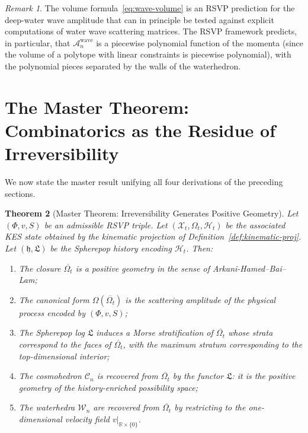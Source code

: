 \documentclass[12pt, oneside]{amsart}
\theoremstyle{plain}
\newtheorem{theorem}{Theorem}[section]
\theoremstyle{definition}
\theoremstyle{remark}
\newtheorem{remark}[theorem]{Remark}
\newcommand{\R}{\mathbb{R}}
\newcommand{\XKS}{\mathcal{X}}
\newcommand{\OmKS}{\Omega}
\newcommand{\HKS}{\mathcal{H}}
\newcommand{\hist}{\mathfrak{h}}
\newcommand{\Log}{\mathfrak{L}}
\newcommand{\Amp}{\mathcal{A}}
\newcommand{\Cosmo}{\mathcal{C}_n}
\newcommand{\Water}{\mathcal{W}_n}
\newcommand{\CF}{\Omega}   %
\begin{document}
\begin{remark}
The volume formula~\eqref{eq:wave-volume} is an RSVP prediction for the deep-water wave amplitude that can in principle be tested against explicit computations of water wave scattering matrices. The RSVP framework predicts, in particular, that $\Amp_n^{\text{wave}}$ is a piecewise polynomial function of the momenta (since the volume of a polytope with linear constraints is piecewise polynomial), with the polynomial pieces separated by the walls of the waterhedron.
\end{remark}

\section{The Master Theorem: Combinatorics as the Residue of Irreversibility}
\label{sec:unification}

We now state the master result unifying all four derivations of the preceding sections.

\begin{theorem}[Master Theorem: Irreversibility Generates Positive Geometry]
\label{thm:master}
Let $(\Phi, v, S)$ be an admissible RSVP triple. Let $(\XKS_t, \OmKS_t, \HKS_t)$ be the associated KES state obtained by the kinematic projection of Definition~\ref{def:kinematic-proj}. Let $(\hist, \Log)$ be the Spherepop history encoding $\HKS_t$. Then:
\begin{enumerate}[label=(\roman*)]
  \item The closure $\overline{\OmKS_t}$ is a positive geometry in the sense of Arkani-Hamed--Bai--Lam;
  \item The canonical form $\CF(\overline{\OmKS_t})$ is the scattering amplitude of the physical process encoded by $(\Phi, v, S)$;
  \item The Spherepop log $\Log$ induces a Morse stratification of $\overline{\OmKS_t}$ whose strata correspond to the faces of $\overline{\OmKS_t}$, with the maximum stratum corresponding to the top-dimensional interior;
  \item The cosmohedron $\Cosmo$ is recovered from $\overline{\OmKS_t}$ by the functor $\Log$: it is the positive geometry of the history-enriched possibility space;
  \item The waterhedra $\Water$ are recovered from $\overline{\OmKS_t}$ by restricting to the one-dimensional velocity field $v|_{\R \times \{0\}}$.
\end{enumerate}
\end{theorem}
\end{document}
